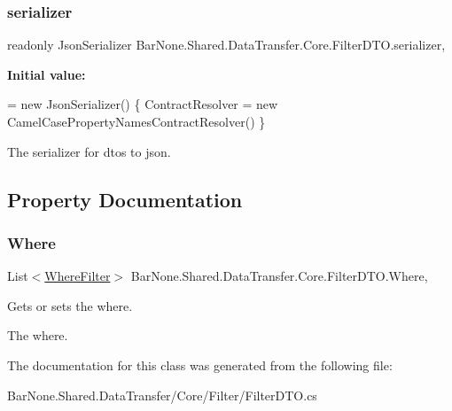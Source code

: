\subsubsection{\texorpdfstring{serializer}{serializer}}
{\footnotesize\ttfamily readonly Json\+Serializer Bar\+None.\+Shared.\+Data\+Transfer.\+Core.\+Filter\+D\+T\+O.\+serializer\hspace{0.3cm}{\ttfamily [static]}, {\ttfamily [private]}}

{\bfseries Initial value\+:}
\begin{DoxyCode}
= \textcolor{keyword}{new} JsonSerializer()
        \{
            ContractResolver = \textcolor{keyword}{new} CamelCasePropertyNamesContractResolver()
        \}
\end{DoxyCode}


The serializer for dtos to json. 



\subsection{Property Documentation}
\mbox{\label{class_bar_none_1_1_shared_1_1_data_transfer_1_1_core_1_1_filter_d_t_o_a3422159feed69350637b219ab1369082}} 
\subsubsection{\texorpdfstring{Where}{Where}}
{\footnotesize\ttfamily List$<$\mbox{\hyperlink{class_bar_none_1_1_shared_1_1_data_transfer_1_1_core_1_1_filter_1_1_where_filter}{Where\+Filter}}$>$ Bar\+None.\+Shared.\+Data\+Transfer.\+Core.\+Filter\+D\+T\+O.\+Where\hspace{0.3cm}{\ttfamily [get]}, {\ttfamily [set]}}



Gets or sets the where. 

The where. 

The documentation for this class was generated from the following file\+:\begin{DoxyCompactItemize}
\item 
Bar\+None.\+Shared.\+Data\+Transfer/\+Core/\+Filter/Filter\+D\+T\+O.\+cs\end{DoxyCompactItemize}
